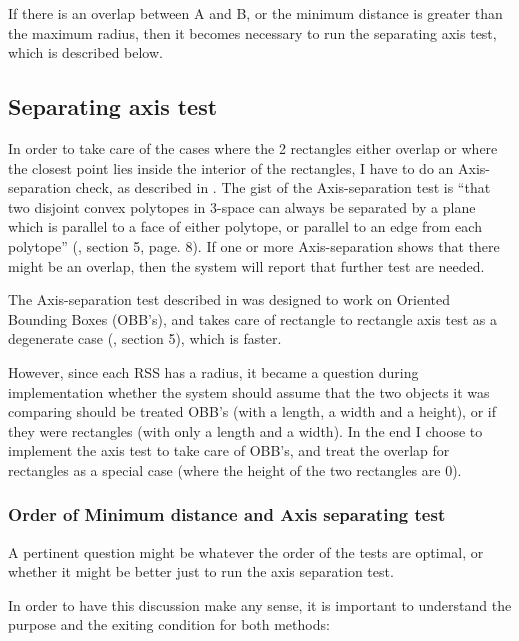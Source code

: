 If there is an overlap between A and B, or the minimum distance is greater than the maximum radius, then it becomes necessary to run the separating axis test, which is described below.

\subsection{Separating axis test}
\label{sepAxis}
In order to take care of the cases where the 2 rectangles either overlap or where the closest point lies inside the interior of the rectangles, I have to do an Axis-separation check, as described in \cite{237244}. The gist of the Axis-separation test is ``that two disjoint convex polytopes in 3-space can always be separated by a plane which is parallel to a face of either polytope, or parallel to an edge from each polytope'' (\cite{237244}, section 5, page. 8). If one or more Axis-separation shows that there might be an overlap, then the system will report that further test are needed.

The Axis-separation test described in \cite{237244} was designed to work on Oriented Bounding Boxes (OBB's), and takes care of rectangle to rectangle axis test as a degenerate case (\cite{237244}, section 5), which is faster. 

However, since each RSS has a radius, it became a question during implementation whether the system should assume that the two objects it was comparing should be treated OBB's (with a length, a width and a height), or if they were rectangles (with only a length and a width). In the end I choose to implement the axis test to take care of OBB's, and treat the overlap for rectangles as a special case (where the height of the two rectangles are 0).

\subsubsection{Order of Minimum distance and Axis separating test}
\label{minAxisOrder}
A pertinent question might be whatever the order of the tests are optimal, or whether it might be better just to run the axis separation test.

In order to have this discussion make any sense, it is important to understand the purpose and the exiting condition for both methods:

